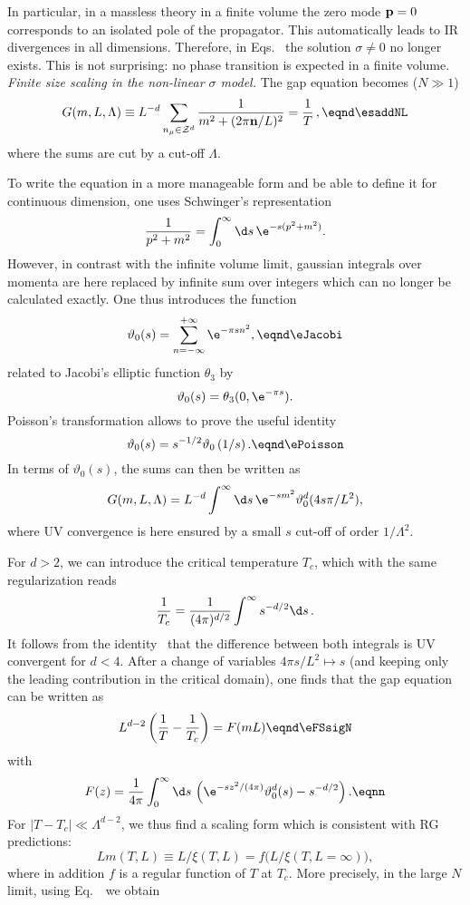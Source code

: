 In particular, in a massless theory in a finite volume the zero mode
${\bf p}=0$   corresponds to an isolated pole of the propagator.
This automatically leads to IR divergences in all dimensions.
Therefore, in Eqs.~\esaddleN{} the solution $\sigma\ne 0$ no longer
exists. This is not surprising:   no phase  transition is expected in a
finite volume.
 \medskip
{\it Finite size scaling in the non-linear $\sigma$ model.}
The gap equation  becomes ($N\gg1$)
$$G(m,L,\Lambda )\equiv L^{-d}\sum_{n_\mu\in{\cal Z}^d}{1\over
m^2+(2\pi {\bf n}/L)^2}={1\over  T }\,,
\eqnd\esaddNL $$
where the sums are cut by a cut-off $\Lambda$.\par
To write the equation  in a more  manageable form and be able
to define it for continuous dimension, one uses Schwinger's
representation
$${1\over p^2+m^2}=\int_0^\infty\d s\,\e^{-s(p^2+m^2)}.$$
However, in contrast with  the infinite volume limit,  gaussian
integrals over momenta are here replaced by  infinite sum over
integers which can no longer be calculated exactly. One thus
introduces the function
$$\vartheta_0(s)= \sum^{+ \infty}_{n=- \infty} \e^{-\pi sn^2},
\eqnd\eJacobi $$
related to Jacobi's elliptic function $\theta_3$ by
$$\vartheta_0(s)=\theta_3(0,\e^{-\pi s}).$$
Poisson's transformation allows to prove the useful identity
$$\vartheta_0(s) = s^{-1/2} \vartheta_0\left(1/s\right).\eqnd \ePoisson $$
In terms of $\vartheta_0(s)$, the sums can then be written as
$$G(m,L,\Lambda) =L^{-d}\int^\infty\d s\,
\e^{-sm^2}\vartheta_0^d(4s\pi/L^2), $$
where UV convergence is here ensured by a small $s$ cut-off of order
$1/\Lambda^2$. \par
For $d>2$, we can introduce the  critical temperature $T_c$, which with
the same regularization reads
$${1\over T_c}={1\over(4\pi)^{d/2}}\int^\infty s^{-d/2}\d s\,.$$
It follows from the identity \ePoisson~that the difference between
both integrals is UV convergent for $d<4$. After
a change of variables $4\pi s/L^2 \mapsto s$ (and keeping only the leading
contribution in the critical domain), one finds that
the gap equation can be written as
$$L^{d-2}\left({1\over T}-{1\over T_c}\right)= F(mL)  \eqnd\eFSsigN  $$
with
$$F(z)={1\over 4\pi } \int_0^\infty\d s\,
\left(\e^{-s z^2 /(4\pi)}\vartheta_0^d(s)-s^{-d/2}\right). \eqnn $$
For $|T-T_c|\ll \Lambda^{d-2}$, we thus find a scaling form
which is consistent with  RG predictions:
$$L m(T,L)\equiv L/\xi(T,L)=f\bigl(L/\xi(T,L=\infty)\bigr) , $$
where in addition $f$ is a regular function of $T$ at $T_c$.
More precisely, in the large $N$ limit, using Eq.~\emasNsig~we obtain
